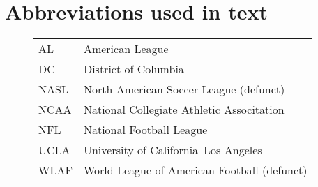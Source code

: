 \section{Abbreviations used in text}
\begin{figure}[H]
\begin{tabular}{l l}
AL & American League \\
DC & District of Columbia \\
NASL & North American Soccer League (defunct) \\
NCAA & National Collegiate Athletic Associtation \\
NFL & National Football League \\
UCLA & University of California--Los Angeles \\
WLAF & World League of American Football (defunct) \\
\end{tabular}
\end{figure}

